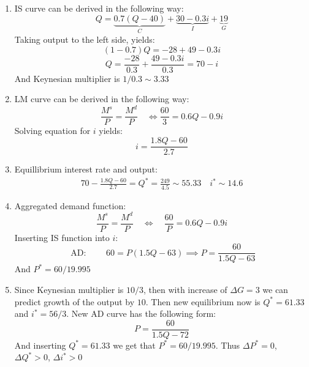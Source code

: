\documentclass[11pt, oneside]{article}
\begin{document}
	\begin{enumerate}[(1)]
	\item IS curve can be derived in the following way:
	\[
	Q = \underbrace{0.7(Q-40)}_{C} + \underbrace{30 -0.3i}_{I} + \underbrace{19}_{G}
	\]
	Taking output to the left side, yields:
	\[
	(1 - 0.7)Q = -28 + 49 - 0.3i
	\]
	\[
	Q = \frac{-28}{0.3} + \frac{49 - 0.3i}{0.3} = 70 - i
	\]
	And Keynesian multiplier is $ 1/0.3 \sim 3.33$
	\item LM curve can be derived in the following way:
	\[
	\frac{M^{s}}{P}  = \frac{M^{d}}{P} \quad \iff \frac{60}{3} = 0.6Q - 0.9i
	\]
	Solving equation for $ i $ yields:
	\[
	i = \frac{1.8Q - 60}{2.7}
	\]
	\item Equillibrium interest rate and output:
	\begin{gather*}
		70 - \frac{1.8Q - 60}{2.7}  = Q^{*} = \frac{249}{4.5} \sim 55.33 \quad i^{*} \sim 14.6
	\end{gather*}
\item 
	Aggregated demand function:
	\[
	\frac{M^{s}}{P} = \frac{M^{d}}{P} \quad \iff \quad \frac{60}{P} = 0.6Q - 0.9i
	\]
	Inserting IS function into $ i $:
	\[
	\text{ AD: }\quad\quad 60 = P( 1.5Q - 63) \implies P = \frac{60}{1.5Q - 63}
	\]
	And $ P^{*} = 60/19.995 $ 
	\item Since Keynesian multiplier is $ 10/3 $, then with increase of $ \Delta G = 3 $ we can predict growth of the output by $ 10 $.  Then new equilibrium now is $ Q^{*}= 61.33$ and $ i^{*} = 56/3 $. New AD curve has the following form:
	\[
	P = \frac{60}{1.5Q-72}
	\]
	And inserting $ Q^{*} = 61.33 $ we get that $ P^* = 60/19.995 $. Thus $ \Delta P^{*} = 0  $, $ \Delta Q^{*} > 0 $, $ \Delta i^{*}  >0$

	
	
\end{enumerate}
	
\end{document}
